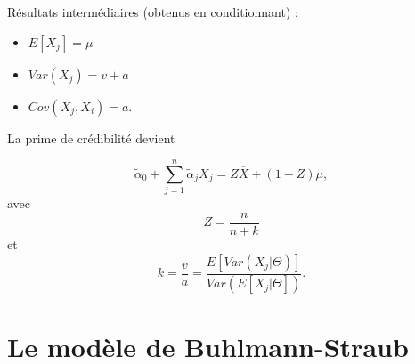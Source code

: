 Résultats intermédiaires (obtenus en conditionnant) :

\begin{itemize}
	\item $\displaystyle E[X_j] = \mu$
	\item $\displaystyle Var(X_j) = v + a$
	\item $\displaystyle Cov(X_j, X_i) = a$.
\end{itemize}

La prime de crédibilité devient

$$\tilde{\alpha}_0 + \sum_{j = 1}^{n}\tilde{\alpha}_jX_j = Z\overline{X} + (1-Z)\mu,$$
avec
$$Z = \frac{n}{n + k}$$
et
$$k = \frac{v}{a} = \frac{E[Var(X_j \vert \Theta)]}{Var(E[X_j \vert \Theta])}.$$

\chapter{Le modèle de Buhlmann-Straub}











